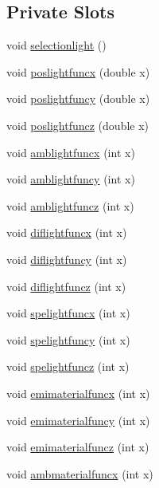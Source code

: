 \subsection*{Private Slots}
\begin{DoxyCompactItemize}
\item 
void \hyperlink{class_mondock_a25391f1fac7a8a46e761f2f8c9c2fdc8}{selectionlight} ()
\item 
void \hyperlink{class_mondock_a05ec25870c70f2eeba2ccdc1da44e7ca}{poslightfuncx} (double x)
\item 
void \hyperlink{class_mondock_ae8593b3cbc4c42badf600599a2e01dce}{poslightfuncy} (double x)
\item 
void \hyperlink{class_mondock_aa5ec8a8453515216ffd85961c868108f}{poslightfuncz} (double x)
\item 
void \hyperlink{class_mondock_a07685bc7db5c3346c1813e84abf8aa2f}{amblightfuncx} (int x)
\item 
void \hyperlink{class_mondock_a2397e94ee9af0a37c12b1443d70c17b6}{amblightfuncy} (int x)
\item 
void \hyperlink{class_mondock_a727e012b9b0df615ea2d585f98b00fb9}{amblightfuncz} (int x)
\item 
void \hyperlink{class_mondock_ad475a793b9d77352f2e844b22315612e}{diflightfuncx} (int x)
\item 
void \hyperlink{class_mondock_a5e60c8e141570f171d420de6f6e9af54}{diflightfuncy} (int x)
\item 
void \hyperlink{class_mondock_a4fd34f4035885b71a4d914ff85496715}{diflightfuncz} (int x)
\item 
void \hyperlink{class_mondock_ad12c449ba7b08f8430353e5fb7687e6a}{spelightfuncx} (int x)
\item 
void \hyperlink{class_mondock_ac2c735aede2c4c621f08f9c34d6a4c9c}{spelightfuncy} (int x)
\item 
void \hyperlink{class_mondock_ad626e2142ce5065af9a3bd891c825a5a}{spelightfuncz} (int x)
\item 
void \hyperlink{class_mondock_a8eefc5e5056a10e66d69e3d8cfb21941}{emimaterialfuncx} (int x)
\item 
void \hyperlink{class_mondock_a1d7a5a172040878b370a2fa56de8774b}{emimaterialfuncy} (int x)
\item 
void \hyperlink{class_mondock_ab69c246125f45077904e519c7f0e397c}{emimaterialfuncz} (int x)
\item 
void \hyperlink{class_mondock_a8311bcb6b47314eba3966861c6cfe53a}{ambmaterialfuncx} (int x)
\item 

\end{DoxyCompactItemize}
